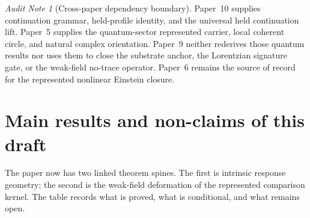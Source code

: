 \documentclass[11pt]{article}
\theoremstyle{remark}
\newtheorem{audit}[theorem]{Audit Note}
\begin{document}
\begin{audit}[Cross-paper dependency boundary]
Paper~10 supplies continuation grammar, held-profile identity, and the universal held continuation lift.  Paper~5 supplies the quantum-sector represented carrier, local coherent circle, and natural complex orientation.  Paper~9 neither rederives those quantum results nor uses them to close the substrate anchor, the Lorentzian signature gate, or the weak-field no-trace operator.  Paper~6 remains the source of record for the represented nonlinear Einstein closure.
\end{audit}

\section{Main results and non-claims of this draft}
\label{sec:main-results}

The paper now has two linked theorem spines.  The first is intrinsic response geometry; the second is the weak-field deformation of the represented comparison kernel.  The table records what is proved, what is conditional, and what remains open.
\end{document}
